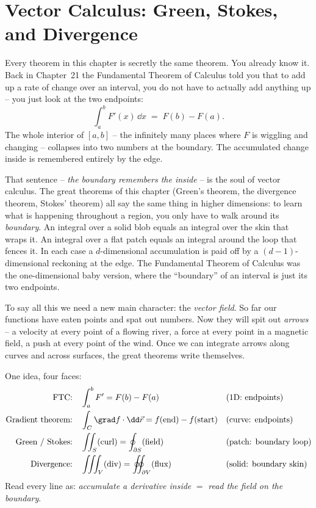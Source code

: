 \chapter{Vector Calculus: Green, Stokes, and Divergence}

\providecommand{\oiint}{\oint\kern-0.62em\oint}

Every theorem in this chapter is secretly the same theorem. You already know it.
Back in Chapter~21 the Fundamental Theorem of Calculus told you that to add up a
rate of change over an interval, you do not have to actually add anything up --
you just look at the two endpoints:
\[
  \int_a^b F'(x)\,\dd x \;=\; F(b) - F(a).
\]
The whole interior of $[a,b]$ -- the infinitely many places where $F$ is wiggling
and changing -- collapses into two numbers at the boundary. The accumulated change
inside is remembered entirely by the edge.

That sentence -- \emph{the boundary remembers the inside} -- is the soul of
vector calculus. The great theorems of this chapter (Green's theorem, the
divergence theorem, Stokes' theorem) all say the same thing in higher dimensions:
to learn what is happening throughout a region, you only have to walk around its
\emph{boundary}. An integral over a solid blob equals an integral over the skin
that wraps it. An integral over a flat patch equals an integral around the loop
that fences it. In each case a $d$-dimensional accumulation is paid off by a
$(d{-}1)$-dimensional reckoning at the edge. The Fundamental Theorem of Calculus
was the one-dimensional baby version, where the ``boundary'' of an interval is
just its two endpoints.

To say all this we need a new main character: the \emph{vector field}. So far our
functions have eaten points and spat out numbers. Now they will spit out
\emph{arrows} -- a velocity at every point of a flowing river, a force at every
point in a magnetic field, a push at every point of the wind. Once we can
integrate arrows along curves and across surfaces, the great theorems write
themselves.

\begin{focusbox}
One idea, four faces:
\[
\begin{aligned}
\text{FTC:} &\quad \int_a^b F' = F(b)-F(a) &&\text{(1D: endpoints)}\\
\text{Gradient theorem:} &\quad \int_C \grad f\cdot \dd\vec r = f(\text{end})-f(\text{start}) &&\text{(curve: endpoints)}\\
\text{Green / Stokes:} &\quad \iint_S (\text{curl}) = \oint_{\partial S}(\text{field}) &&\text{(patch: boundary loop)}\\
\text{Divergence:} &\quad \iiint_V (\text{div}) = \oiint_{\partial V}(\text{flux}) &&\text{(solid: boundary skin)}
\end{aligned}
\]
Read every line as: \emph{accumulate a derivative inside} $=$ \emph{read the
field on the boundary}.
\end{focusbox}

